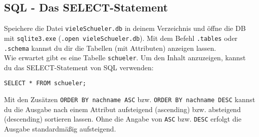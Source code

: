 \subsection[SELECT-Statement]{SQL - Das SELECT-Statement}
Speichere die Datei \texttt{vieleSchueler.db} in deinem Verzeichnis und öffne die DB mit \texttt{sqlite3.exe} (\lstinline!.open vieleSchueler.db!). Mit dem Befehl \lstinline!.tables! oder \lstinline!.schema! kannst du dir die Tabellen (mit Attributen) anzeigen lassen.\\
Wie erwartet gibt es eine Tabelle \lstinline!schueler!. Um den Inhalt anzuzeigen, kannst du das SELECT-Statement von SQL verwenden:
\begin{tcolorbox}[title=SELECT-Statement]
	\lstinline!SELECT * FROM schueler;!
\end{tcolorbox}
Mit den Zusätzen \lstinline!ORDER BY nachname ASC! bzw. \lstinline!ORDER BY nachname DESC!  kannst du die Ausgabe nach einem Attribut aufsteigend (ascending) bzw. absteigend (descending) sortieren lassen. Ohne die Angabe von \lstinline!ASC! bzw. \lstinline!DESC! erfolgt die Ausgabe standardmäßig aufsteigend.

